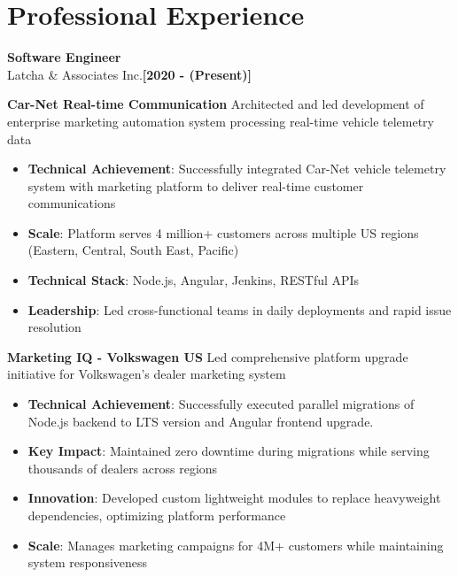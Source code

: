 \documentclass[letterpaper,10pt]{article}
\newcommand{\timelineEntry}[3]{%
	\noindent\color{accent}\large\textbf{#1}\\
	{\color{accent}#2}\hfill\textbf{\color{accent}\small[#3]}
	\newline\newline
}
\begin{document}
\section{Professional Experience}
\timelineEntry{Software Engineer}{Latcha \& Associates Inc.}{2020 - \the\year\space(Present)}
\noindent\large\textbf{Car-Net Real-time Communication}\newline
\noindent Architected and led development of enterprise marketing automation system processing real-time vehicle telemetry data
\begin{itemize}[leftmargin=*, nosep, itemsep=0.4em, before=\vspace{0.6em}, after=\vspace{0.8em}, label={}]
	\item \textbf{Technical Achievement}: Successfully integrated Car-Net vehicle telemetry system with marketing platform to deliver real-time customer communications
	\item \textbf{Scale}: Platform serves 4 million+ customers across multiple US regions (Eastern, Central, South East, Pacific)
	\item \textbf{Technical Stack}: Node.js, Angular, Jenkins, RESTful APIs
	\item \textbf{Leadership}: Led cross-functional teams in daily deployments and rapid issue resolution
\end{itemize}

\vspace{0.4em}\noindent\large\textbf{Marketing IQ - Volkswagen US}\newline
\noindent Led comprehensive platform upgrade initiative for Volkswagen's dealer marketing system
\begin{itemize}[leftmargin=*, nosep, itemsep=0.4em, before=\vspace{0.6em}, after=\vspace{0.8em}, label={}]
	\item \textbf{Technical Achievement}: Successfully executed parallel migrations of Node.js backend to LTS version and Angular frontend upgrade.
	\item \textbf{Key Impact}: Maintained zero downtime during migrations while serving thousands of dealers across regions
	\item \textbf{Innovation}: Developed custom lightweight modules to replace heavyweight dependencies, optimizing platform performance
	\item \textbf{Scale}: Manages marketing campaigns for 4M+ customers while maintaining system responsiveness
\end{itemize}
\end{document}
